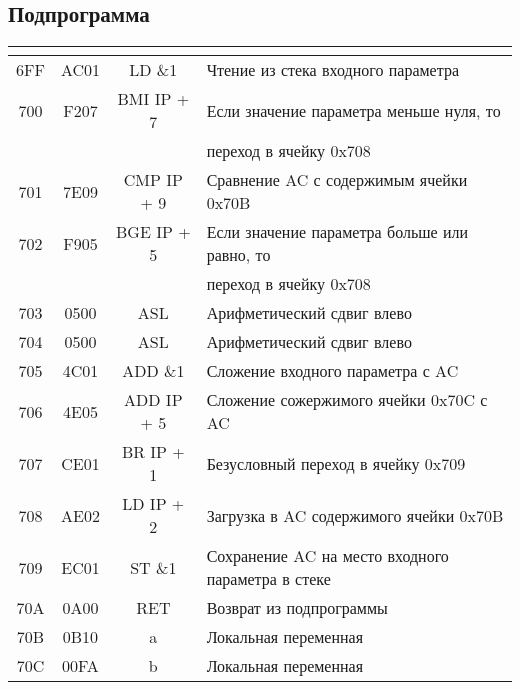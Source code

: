 \subsection{Подпрограмма}
\begin{flushleft}
	\begin{tabular}{|c|c|c|l|}
		\hline
		&
		&
		&\\
		\hline
		6FF & AC01 & LD \&1 & Чтение из стека входного параметра \\

		700 & F207 & BMI IP + 7 & Если значение параметра меньше нуля, то\\ & & & переход в ячейку 0x708 \\
		701 & 7E09 & CMP IP + 9 & Сравнение AC с содержимым ячейки 0x70B \\

		702 & F905 & BGE IP + 5 & Если значение параметра больше или равно, то\\ & & & переход в ячейку 0x708 \\

		703 & 0500 & ASL & Арифметический сдвиг влево \\

		704 & 0500 & ASL & Арифметический сдвиг влево \\

		705 & 4C01 & ADD \&1 & Сложение входного параметра с AC \\

		706 & 4E05 & ADD IP + 5 & Сложение сожержимого ячейки 0x70C с AC \\
		707 & CE01 & BR IP + 1 & Безусловный переход в ячейку 0x709 \\

		708 & AE02 & LD IP + 2 & Загрузка в AC содержимого ячейки 0x70B\\
		709 & EC01 & ST \&1 & Сохранение AC на место входного параметра в стеке \\
		70A & 0A00 & RET & Возврат из подпрограммы \\
		\hline
		70B & 0B10 & a & Локальная переменная \\

		70C & 00FA & b & Локальная переменная \\
		\hline	
	\end{tabular}
\end{flushleft}

